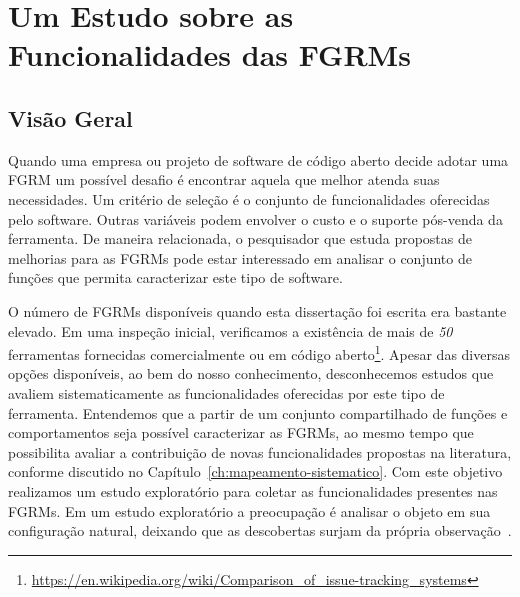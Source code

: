 
\section{Um Estudo sobre as Funcionalidades das FGRMs}
\label{sec:caracterizacao_ferramentas}

\subsection{Visão Geral}
\label{subsec:caracterizacao_intro}

Quando uma empresa ou projeto de software de código aberto decide adotar uma
FGRM um possível desafio é encontrar aquela que melhor atenda suas necessidades.
Um critério de seleção é o conjunto de funcionalidades oferecidas pelo software.
Outras variáveis podem envolver o custo e o suporte pós-venda da ferramenta. De
maneira relacionada, o pesquisador que estuda propostas de melhorias para as
FGRMs pode estar interessado em analisar o conjunto de funções que permita
caracterizar este tipo de software.

O número de FGRMs disponíveis quando esta dissertação foi escrita era bastante
elevado. Em uma inspeção inicial, verificamos a existência de mais de
\textit{50} ferramentas fornecidas comercialmente ou em código
aberto\footnote{\url{https://en.wikipedia.org/wiki/Comparison_of_issue-tracking_systems}}.
Apesar das diversas opções disponíveis, ao bem do nosso conhecimento,
desconhecemos estudos que avaliem sistematicamente as funcionalidades oferecidas
por este tipo de ferramenta. Entendemos que a partir de um conjunto
compartilhado de funções e comportamentos seja possível caracterizar as FGRMs,
ao mesmo tempo que possibilita avaliar a contribuição de novas funcionalidades
propostas na li\-te\-ra\-tu\-ra, conforme discutido no
Capítulo~\ref{ch:mapeamento-sistematico}. Com este objetivo realizamos um estudo
exploratório para coletar as funcionalidades presentes nas FGRMs. Em um estudo
exploratório a preocupação é analisar o objeto em sua configuração natural,
deixando que as descobertas surjam da própria
observação~\cite{wohlin2012experimentation}.

